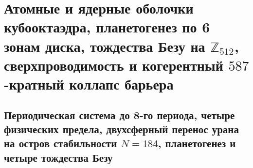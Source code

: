 \chapter{Атомные и ядерные оболочки кубооктаэдра, планетогенез по 6 зонам диска, тождества Безу на \texorpdfstring{$\mathbb{Z}_{512}$}{Z512}, сверхпроводимость и когерентный \texorpdfstring{$587$}{587}-кратный коллапс барьера}
\label{ch:mono-chemistry-nuclear}

\section{Периодическая система до 8-го периода, четыре физических предела, двухсферный перенос урана на остров стабильности \texorpdfstring{$N=184$}{N=184}, планетогенез и четыре тождества Безу}

